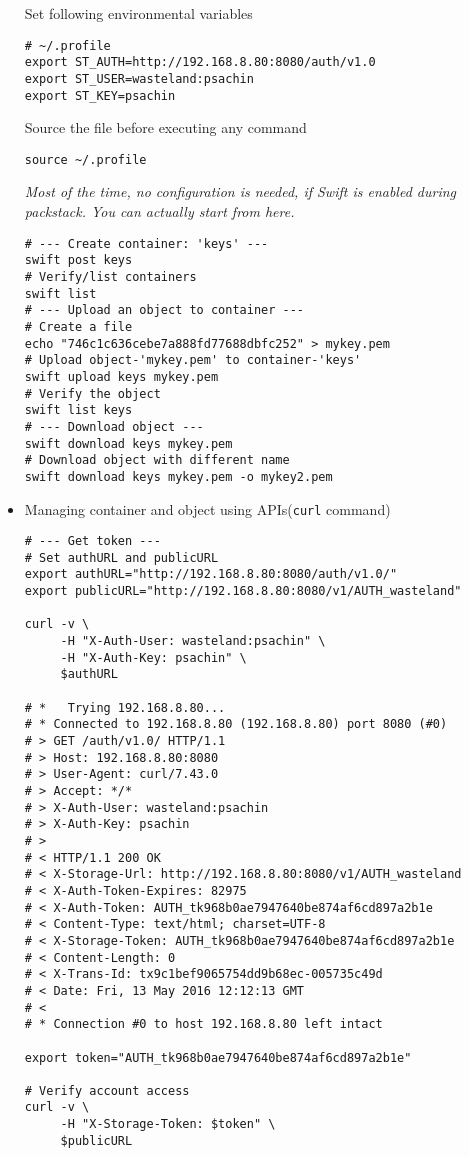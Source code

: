 \documentclass{article}
\begin{document}
\begin{itemize}
Set following environmental variables
\begin{verbatim}
# ~/.profile
export ST_AUTH=http://192.168.8.80:8080/auth/v1.0
export ST_USER=wasteland:psachin
export ST_KEY=psachin
\end{verbatim}

Source the file before executing any command
\begin{verbatim}
source ~/.profile
\end{verbatim}

\emph{Most of the time, no configuration is needed, if Swift is
enabled during packstack. You can actually start from here.}
\begin{verbatim}
# --- Create container: 'keys' ---
swift post keys
# Verify/list containers
swift list
# --- Upload an object to container ---
# Create a file
echo "746c1c636cebe7a888fd77688dbfc252" > mykey.pem
# Upload object-'mykey.pem' to container-'keys'
swift upload keys mykey.pem
# Verify the object
swift list keys
# --- Download object ---
swift download keys mykey.pem
# Download object with different name
swift download keys mykey.pem -o mykey2.pem
\end{verbatim}
\item Managing container and object using APIs(\texttt{curl} command)
\begin{verbatim}
# --- Get token ---
# Set authURL and publicURL
export authURL="http://192.168.8.80:8080/auth/v1.0/"
export publicURL="http://192.168.8.80:8080/v1/AUTH_wasteland"

curl -v \
     -H "X-Auth-User: wasteland:psachin" \
     -H "X-Auth-Key: psachin" \
     $authURL

# *   Trying 192.168.8.80...
# * Connected to 192.168.8.80 (192.168.8.80) port 8080 (#0)
# > GET /auth/v1.0/ HTTP/1.1
# > Host: 192.168.8.80:8080
# > User-Agent: curl/7.43.0
# > Accept: */*
# > X-Auth-User: wasteland:psachin
# > X-Auth-Key: psachin
# >
# < HTTP/1.1 200 OK
# < X-Storage-Url: http://192.168.8.80:8080/v1/AUTH_wasteland
# < X-Auth-Token-Expires: 82975
# < X-Auth-Token: AUTH_tk968b0ae7947640be874af6cd897a2b1e
# < Content-Type: text/html; charset=UTF-8
# < X-Storage-Token: AUTH_tk968b0ae7947640be874af6cd897a2b1e
# < Content-Length: 0
# < X-Trans-Id: tx9c1bef9065754dd9b68ec-005735c49d
# < Date: Fri, 13 May 2016 12:12:13 GMT
# <
# * Connection #0 to host 192.168.8.80 left intact

export token="AUTH_tk968b0ae7947640be874af6cd897a2b1e"

# Verify account access
curl -v \
     -H "X-Storage-Token: $token" \
     $publicURL


\end{verbatim}
\end{itemize}
\end{document}
